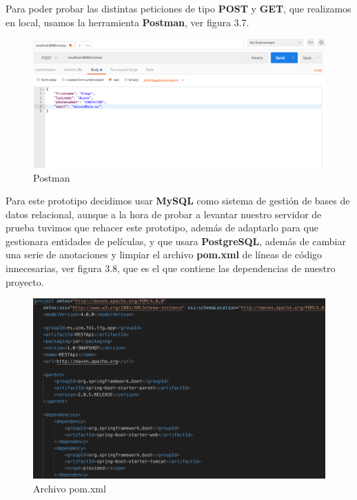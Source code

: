 \begin{flushleft}
    Para poder probar las distintas peticiones de tipo \textbf{POST} y \textbf{GET}, que realizamos en local, usamos la herramienta 
    \textbf{Postman}, ver figura 3.7.
    \begin{figure}[H]
        \centering
        \includegraphics[width=6in]{figures/Postman.png}
        \caption{Postman}
    \end{figure}
    Para este prototipo decidimos usar \textbf{MySQL} como sistema de gestión de bases de datos relacional, aunque
    a la hora de probar a levantar nuestro servidor de prueba tuvimos que rehacer este prototipo, además de adaptarlo para 
    que gestionara entidades de películas, y que usara \textbf{PostgreSQL}, además de cambiar una serie de anotaciones y limpiar 
    el archivo \textbf{pom.xml} de líneas de código innecesarias, ver figura 3.8, que es el que contiene las dependencias de nuestro proyecto.
    \begin{figure}[H]
        \centering
        \includegraphics[width=6in]{figures/PomXML.png}
        \caption{Archivo pom.xml}
    \end{figure}
\end{flushleft}
